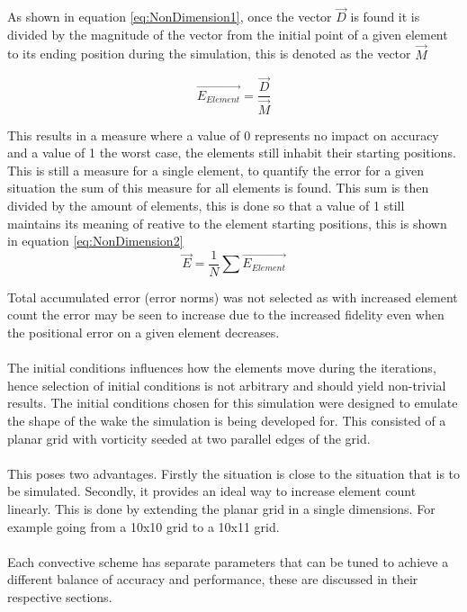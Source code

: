 As shown in equation \ref{eq:NonDimension1}, once the vector $\vec{D}$ is found it is divided by the magnitude of the vector from the initial point of a given element to its ending position during the simulation, this is denoted as the vector $\vec{M}$

\begin{equation}
\label{eq:NonDimension1}
\vec{E_{Element}}=\frac{\vec{D}}{\vec{M}}
\end{equation}

This results in a measure where a value of 0 represents no impact on accuracy and a value of 1 the worst case, the elements still inhabit their starting positions. This is still a measure for a single element, to quantify the error for a given situation the sum of this measure for all elements is found. This sum is then divided by the amount of elements, this is done so that a value of 1 still maintains its meaning of reative to the element starting positions, this is shown in equation \ref{eq:NonDimension2}
\begin{equation}
\label{eq:NonDimension2}
\vec{E}=\frac{1}{N}\sum{\vec{E_{Element}}}
\end{equation}

Total accumulated error (error norms) was not selected as with increased element count the error may be seen to increase due to the increased fidelity even when the positional  error on a given element decreases.
\\\\
The initial conditions influences how the elements move during the iterations, hence selection of initial conditions is not arbitrary and should yield non-trivial results. The initial conditions chosen for this simulation were designed to emulate the shape of the wake the simulation is being developed for. This consisted of a planar grid with vorticity seeded at two parallel edges of the grid. 
\\\\
This poses two advantages. Firstly the situation is close to the situation that is to be simulated. Secondly, it provides an ideal way to increase element count linearly. This is done by extending the planar grid in a single dimensions. For example going from a 10x10 grid to a 10x11 grid. 
\\\\
Each convective scheme has separate parameters that can be tuned to achieve a different balance of accuracy and performance, these are discussed in their respective sections.

